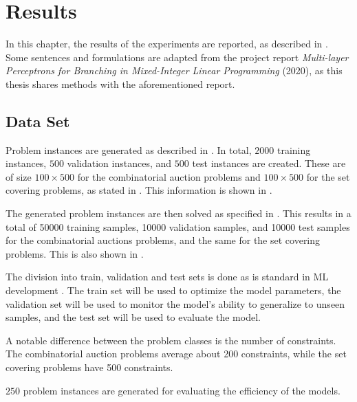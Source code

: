 \chapter{Results}\label{cha:results}

In this chapter, the results of the experiments are reported, as described in . Some sentences and formulations are adapted from the project report \textit{Multi-layer Perceptrons for Branching in Mixed-Integer Linear Programming} (2020), as this thesis shares methods with the aforementioned report. 


\section{Data Set}\label{sec:datagen}

Problem instances are generated as described in . In total, $2000$ training instances, $500$ validation instances, and $ 500 $ test instances are created. These are of size $100 \times 500$ for the combinatorial auction problems and $100 \times 500$ for the set covering problems, as stated in . This information is shown in .

The generated problem instances are then solved as specified in . This results in a total of 50000 training samples, 10000 validation samples, and 10000 test samples for the combinatorial auctions problems, and the same for the set covering problems. This is also shown in .

The division into train, validation and test sets is done as is standard in \gls{ML} development \cite{goodfellow2016deep}. The train set will be used to optimize the model parameters, the validation set will be used to monitor the model's ability to generalize to unseen samples, and the test set will be used to evaluate the model. 

A notable difference between the problem classes is the number of constraints. The combinatorial auction problems average about 200 constraints, while the set covering problems have 500 constraints.  

$250$ problem instances are generated for evaluating the efficiency of the models. %

